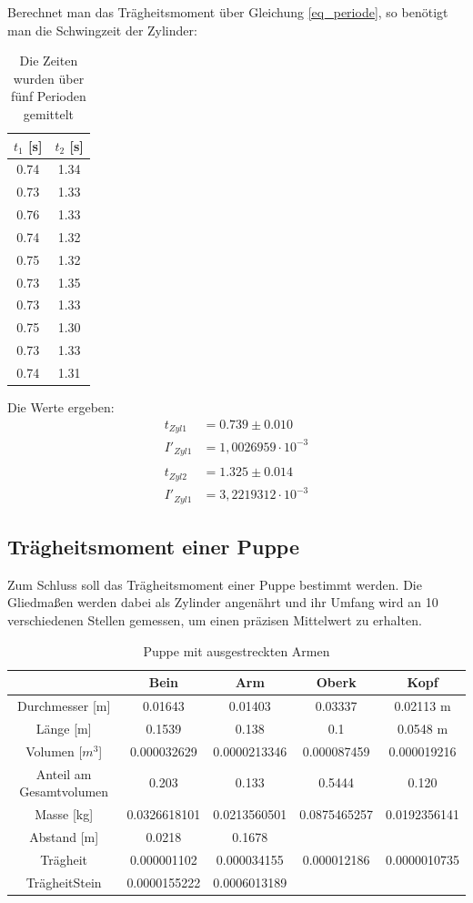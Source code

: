 Berechnet man das Trägheitsmoment über Gleichung \eqref{eq_periode}, so benötigt man die Schwingzeit der Zylinder:
\begin{table}[htbp]
\begin{tabular}{|c|c|}
\hline 
$t_1$ [s] & $t_2$ [s]\\ \hline
0.74&	1.34\\ \hline
0.73&	1.33\\ \hline
0.76&	1.33\\ \hline
0.74&	1.32\\ \hline
0.75&	1.32\\ \hline
0.73&	1.35\\ \hline
0.73&	1.33\\ \hline
0.75&	1.30\\ \hline
0.73&	1.33\\ \hline
0.74&	1.31\\ \hline
\end{tabular} 
\caption{Die Zeiten wurden über fünf Perioden gemittelt}
\end{table}
\newpage
Die Werte ergeben:
\begin{align*}
t_{Zyl 1}&=0.739 \pm 0.010\\
I'_{Zyl 1}&=1,0026959\cdot10^{-3}\\
\end{align*}
\begin{align*}
t_{Zyl 2}&=1.325 \pm  0.014\\
I'_{Zyl 1}&=3,2219312\cdot10^{-3}
\end{align*}

\subsection{Trägheitsmoment einer Puppe}
Zum Schluss soll das Trägheitsmoment einer Puppe bestimmt werden. Die Gliedmaßen werden dabei als Zylinder angenährt und ihr Umfang wird an 10 verschiedenen Stellen gemessen, um einen präzisen Mittelwert zu erhalten.
\begin{table}[htbp]
\begin{tabular}{|c|c|c|c|c|}
\hline 		
&	Bein&	Arm	&Oberk	&Kopf	\\ \hline	
Durchmesser [m]&	0.01643&	0.01403&	0.03337&	0.02113	m\\ \hline				
Länge [m] &	0.1539	&0.138	&0.1	&0.0548	m\\ \hline	
					
Volumen [$m^3$]	&0.000032629	&0.0000213346	&0.000087459	&0.000019216	\\ \hline	
Anteil am Gesamtvolumen	&0.203	&0.133	&0.5444	&0.120	\\ \hline		
Masse [kg]	&0.0326618101	&0.0213560501	&0.0875465257	&0.0192356141\\ \hline
Abstand [m]	&0.0218	&0.1678	&&\\ \hline	
					
Trägheit&	0.000001102	&0.000034155&	0.000012186	&0.0000010735\\ \hline	
TrägheitStein	&0.0000155222	&0.0006013189	&&	\\ \hline	
\end{tabular} 
\caption{Puppe mit ausgestreckten Armen}
\end{table}

